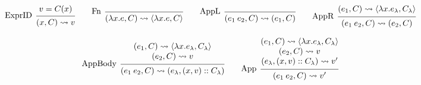 \documentclass{article}
\theoremstyle{definition}
\newcommand*{\cons}{::}
\newcommand*{\semarrow}{\rightsquigarrow}
\begin{document}
\begin{figure}[h!]
  \begin{flushright}
    \fbox{$(e,C)\semarrow V\text{ or }(e',C')$}
  \end{flushright}
  \centering
  \vspace{0pt} %
  \[
    \begin{prooftree}
      \hypo{v=C(x)}
      \infer[left label=ExprID]1{
      (x, C)
      \semarrow
      v
      }
    \end{prooftree}\qquad
    \begin{prooftree}
      \infer[left label=Fn]0{
      (\lambda x.e, C)
      \semarrow
      \langle\lambda x.e, C\rangle
      }
    \end{prooftree}\qquad
    \begin{prooftree}
      \infer[left label={AppL}]0{
      (e_{1}\:e_{2}, C)
      \semarrow
      (e_{1},C)
      }
    \end{prooftree}\qquad
    \begin{prooftree}
      \hypo{
        \begin{matrix}
          (e_{1}, C)
          \semarrow
          \langle\lambda x.e_{\lambda}, C_{\lambda}\rangle
        \end{matrix}
      }
      \infer[left label={AppR}]1{
      (e_{1}\:e_{2}, C)
      \semarrow
      (e_{2}, C)
      }
    \end{prooftree}
  \]

  \[
    \begin{prooftree}
      \hypo{
        \begin{matrix}
          (e_{1}, C)
          \semarrow
          \langle\lambda x.e_{\lambda}, C_{\lambda}\rangle \\
          (e_{2}, C)
          \semarrow
          v
        \end{matrix}
      }
      \infer[left label={AppBody}]1{
      (e_{1}\:e_{2}, C)
      \semarrow
      (e_{\lambda}, (x, v)\cons C_{\lambda})
      }
    \end{prooftree}\qquad
    \begin{prooftree}
      \hypo{
        \begin{matrix}
          (e_{1}, C)
          \semarrow
          \langle\lambda x.e_{\lambda}, C_{\lambda}\rangle \\
          (e_{2}, C)
          \semarrow
          v                                                \\
          (e_{\lambda}, (x, v)\cons C_{\lambda})
          \semarrow
          v'
        \end{matrix}
      }
      \infer[left label={App}]1{
      (e_{1}\:e_{2}, C)
      \semarrow
      v'
      }
    \end{prooftree}
  \]


\end{figure}
\end{document}
